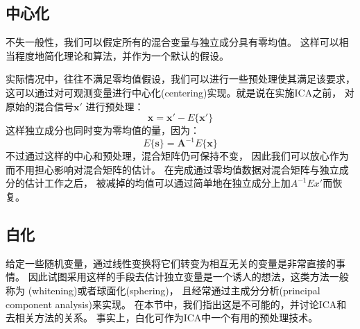 \subsection{中心化}
不失一般性，我们可以假定所有的混合变量与独立成分具有零均值。
这样可以相当程度地简化理论和算法，并作为一个默认的假设。

实际情况中，往往不满足零均值假设，我们可以进行一些预处理使其满足该要求，
这可以通过对可观测变量进行中心化(centering)实现。就是说在实施ICA之前，
对原始的混合信号$\bm{x'}$
进行预处理：
\begin{equation} 
\bm{x=x'}-E\{\bm{x'}\}
\end{equation}
这样独立成分也同时变为零均值的量，因为：
\begin{equation}
E\{\bm{s}\}=\bm{A}^{-1}E\{\bm{x}\}
\end{equation}
不过通过这样的中心和预处理，混合矩阵仍可保持不变，
因此我们可以放心作为而不用担心影响对混合矩阵的估计。
在完成通过零均值数据对混合矩阵与独立成分的估计工作之后，
被减掉的均值可以通过简单地在独立成分上加$A^{-1}E{x'}$而恢复。
    
\subsection{白化}
给定一些随机变量，通过线性变换将它们转变为相互无关的变量是非常直接的事情。
因此试图采用这样的手段去估计独立变量是一个诱人的想法，这类方法一般称为
(whitening)或者球面化(sphering)，
且经常通过主成分分析(principal component analysis)来实现。
在本节中，我们指出这是不可能的，并讨论ICA和去相关方法的关系。
事实上，白化可作为ICA中一个有用的预处理技术。

